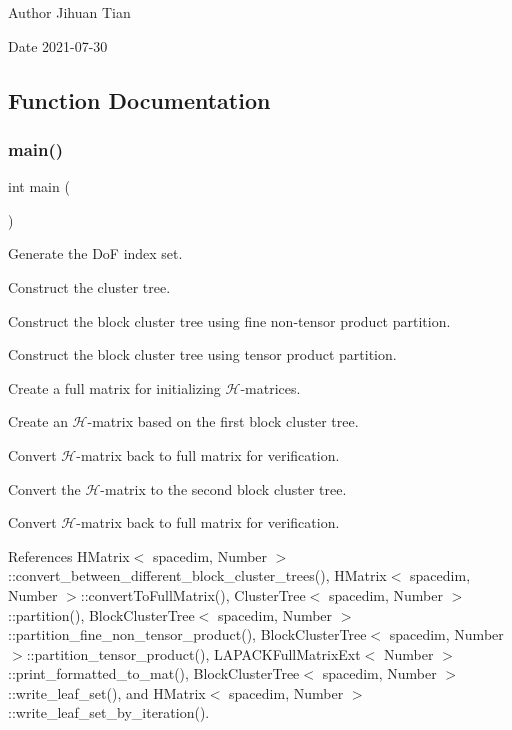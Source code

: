 \begin{DoxyAuthor}{Author}
Jihuan Tian 
\end{DoxyAuthor}
\begin{DoxyDate}{Date}
2021-\/07-\/30 
\end{DoxyDate}


\subsection{Function Documentation}
\mbox{\label{hmatrix-fine-ntp-to-tp_8cc_ae66f6b31b5ad750f1fe042a706a4e3d4}} 
\subsubsection{\texorpdfstring{main()}{main()}}
{\footnotesize\ttfamily int main (\begin{DoxyParamCaption}{ }\end{DoxyParamCaption})}

Generate the DoF index set.

Construct the cluster tree.

Construct the block cluster tree using fine non-\/tensor product partition.

Construct the block cluster tree using tensor product partition.

Create a full matrix for initializing $\mathcal{H}$-\/matrices.

Create an $\mathcal{H}$-\/matrix based on the first block cluster tree.

Convert $\mathcal{H}$-\/matrix back to full matrix for verification.

Convert the $\mathcal{H}$-\/matrix to the second block cluster tree.

Convert $\mathcal{H}$-\/matrix back to full matrix for verification.

References H\+Matrix$<$ spacedim, Number $>$\+::convert\+\_\+between\+\_\+different\+\_\+block\+\_\+cluster\+\_\+trees(), H\+Matrix$<$ spacedim, Number $>$\+::convert\+To\+Full\+Matrix(), Cluster\+Tree$<$ spacedim, Number $>$\+::partition(), Block\+Cluster\+Tree$<$ spacedim, Number $>$\+::partition\+\_\+fine\+\_\+non\+\_\+tensor\+\_\+product(), Block\+Cluster\+Tree$<$ spacedim, Number $>$\+::partition\+\_\+tensor\+\_\+product(), L\+A\+P\+A\+C\+K\+Full\+Matrix\+Ext$<$ Number $>$\+::print\+\_\+formatted\+\_\+to\+\_\+mat(), Block\+Cluster\+Tree$<$ spacedim, Number $>$\+::write\+\_\+leaf\+\_\+set(), and H\+Matrix$<$ spacedim, Number $>$\+::write\+\_\+leaf\+\_\+set\+\_\+by\+\_\+iteration().

